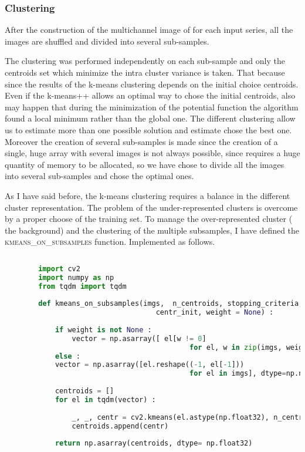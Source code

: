 		
		\subsubsection*{Clustering} 
		
		After the construction of the multichannel image of for each input series, all the images are shuffled and divided into several sub-samples. 
		
		The clustering was performed independently on each sub-sample and only the centroids set which minimize the intra cluster variance is taken. That because since the results of the k-means clustering depends on the initial choice centroids. Even if the k-means++ allows an optimal way to chose the initial centroids, also may happen that during the minimization of the potential function the algorithm found a local minimum rather than the global one. The different clustering allow us to estimate more than one possible solution and estimate chose the best one. 		
		Moreover the creation of several sub-samples is made since the creation of a single, huge array with several images is not always possible, since requires a huge quantity of memory to be allocated, so we have chose to divide all the images into several sub-samples and chose the optimal ones.
		
		As I have said before, the k-means clustering requires a balance in the different cluster representation. The problem of the under-represented clusters is overcome by a proper choose of the training set. To manage the over-represented cluster ( the background) and the clustering of the multiple subsamples, I have defined the \textsc{kmeans\_on\_subsamples} function. Implemented as follows.
		
		\lstset{style=python}
		\begin{lstlisting}[language=python, caption=kmenas\_on\_subsamples, label=code:kmeans]
			
		import cv2
		import numpy as np
		from tqdm import tqdm
			
		def kmeans_on_subsamples(imgs,  n_centroids, stopping_criteria, 
									centr_init, weight = None) :
			
			if weight is not None :
				vector = np.asarray([ el[w != 0] 
											for el, w in zip(imgs, weight)], dtype = np.ndarray)
			else :
			vector = np.asarray([el.reshape((-1, el[-1])) 
											for el in imgs], dtype=np.ndarray)
			
			centroids = []
			for el in tqdm(vector) :
			
				_, _, centr = cv2.kmeans(el.astype(np.float32), n_centroids, None, stopping_criteria, 10, centr_init)				
				centroids.append(centr)
			
			return np.asarray(centroids, dtype= np.float32)
			
		\end{lstlisting}
	
